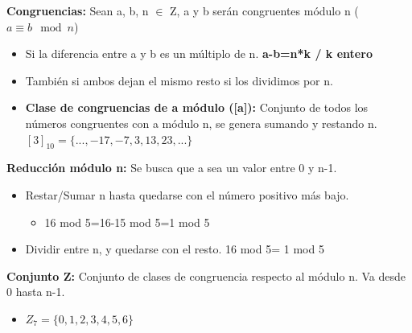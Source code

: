 \documentclass[12pt, twoside, openright]{report} %
\begin{document}
  
  \textbf{Congruencias:} Sean a, b, n $\in$ Z, a y b serán congruentes
  módulo n ($a \equiv b  \mod n$)
  

  \begin{itemize}
  \item Si la diferencia entre a y b es un múltiplo de n. \textbf{a-b=n*k /
    k entero}
    
  \item También si ambos dejan el mismo resto si los dividimos por n.
    
  \item \textbf{Clase de congruencias de a módulo ([a]):} Conjunto de
    todos los números congruentes con a módulo n, se genera sumando y
    restando n. $[3]_{10}=\{..., -17, -7, 3, 13, 23,...\}$
    
  \end{itemize}

  
  \textbf{Reducción módulo n:} Se busca que a sea un valor entre 0 y
  n-1.
  

  \begin{itemize}
  \item Restar/Sumar n hasta quedarse con el número positivo más bajo.
    

    \begin{itemize}
    \item 16 mod 5=16-15 mod 5=1 mod 5
      
    \end{itemize}
  \item Dividir entre n, y quedarse con el resto. 16 mod 5= 1 mod 5
    
  \end{itemize}

  
  \textbf{Conjunto Z:} Conjunto de clases de congruencia respecto al
  módulo n. Va desde 0 hasta n-1.
  

  \begin{itemize}
  \item
    
	$Z_7 = \{0, 1, 2, 3, 4, 5, 6\}$
    
  \end{itemize}
\end{document}
